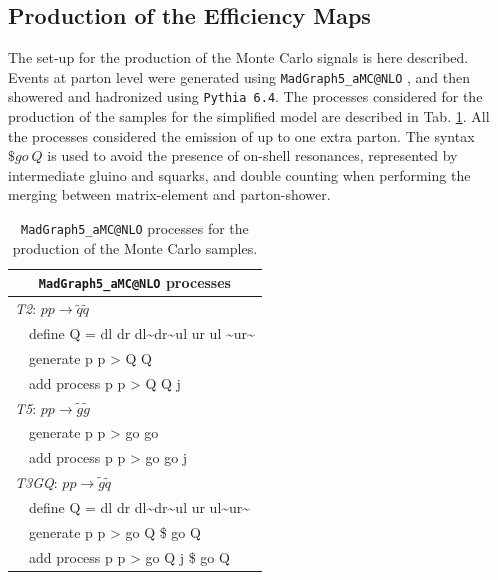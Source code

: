 \documentclass[a4paper,10pt]{article}
\newcommand{\TGQ}{ \textit{T3GQ}}
\newcommand{\Ttwo}{ \textit{T2}}
\newcommand{\Tfive}{ \textit{T5}}
\begin{document}
\subsection{Production of the Efficiency Maps}
The set-up for the production of the Monte Carlo signals is here described. Events at parton level were generated using \texttt{MadGraph5\_aMC@NLO}\cite{2011uj} , and then showered and hadronized using \texttt{Pythia 6.4}\cite{Sjostrand:2006za}. The processes considered for the production of the samples for the simplified model are described in Tab. \ref{mg5_processes}. All the processes considered the emission of up to one extra parton. The syntax $\$go \ Q$ is used to avoid the presence of on-shell resonances, represented by intermediate gluino and squarks, and double counting when performing the merging between matrix-element and parton-shower.
%
\small
\begin{table}[!]
\begin{center}
\renewcommand{\arraystretch}{1.0}
\begin{tabular}{ l l }  \toprule  \toprule 
\multicolumn{2}{c}{\texttt{MadGraph5\_aMC@NLO} processes} \\ \toprule \toprule
\multicolumn{2}{l}{\Ttwo: $p p \rightarrow \tilde q \tilde q$}  \\
     & define Q = dl dr dl\textasciitilde dr\textasciitilde ul ur ul \textasciitilde ur\textasciitilde \\
     & generate p p > Q Q  \\
     &  add process p p > Q Q j \\  \toprule 
\multicolumn{2}{l}{\Tfive: $p p \rightarrow \tilde g \tilde g$ } \\ 
     & generate p p > go go \\
     &  add process p p > go go j \\ \toprule 
\multicolumn{2}{l}{\TGQ: $p p \rightarrow \tilde g \tilde q$} \\  
     &  define Q = dl dr dl\textasciitilde dr\textasciitilde ul ur ul\textasciitilde ur\textasciitilde \\
     &  generate p p > go Q \$ go Q \\
     &  add process p p > go Q j \$ go Q \\  \bottomrule \bottomrule 
%
\end{tabular}
\end{center}
\caption{\texttt{MadGraph5\_aMC@NLO} processes for the production of the Monte Carlo samples.}
\label{mg5_processes}
\end{table}
\end{document}
